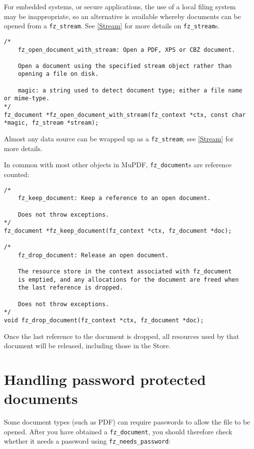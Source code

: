 \documentclass[oneside]{book}
\newcommand{\rjwref}[1] {\autoref{#1} \nameref{#1}}
\begin{document}
For embedded systems, or secure applications, the use of a local filing system may be inappropriate, so an alternative is available whereby documents can be opened from a \texttt{fz\_stream}. See \rjwref{Stream} for more details on \texttt{fz\_stream}s.

\begin{lstlisting}
/*
	fz_open_document_with_stream: Open a PDF, XPS or CBZ document.

	Open a document using the specified stream object rather than
	opening a file on disk.

	magic: a string used to detect document type; either a file name or mime-type.
*/
fz_document *fz_open_document_with_stream(fz_context *ctx, const char *magic, fz_stream *stream);
\end{lstlisting}

Almost any data source can be wrapped up as a \texttt{fz\_stream}; see \rjwref{Stream} for more details.

In common with most other objects in MuPDF, \texttt{fz\_document}s are reference counted:

\begin{lstlisting}
/*
	fz_keep_document: Keep a reference to an open document.
	
	Does not throw exceptions.
*/
fz_document *fz_keep_document(fz_context *ctx, fz_document *doc);

/*
	fz_drop_document: Release an open document.

	The resource store in the context associated with fz_document
	is emptied, and any allocations for the document are freed when
	the last reference is dropped.

	Does not throw exceptions.
*/
void fz_drop_document(fz_context *ctx, fz_document *doc);
\end{lstlisting}

Once the last reference to the document is dropped, all resources used by that document will be released, including those in the Store.


\section{Handling password protected documents}


Some document types (such as PDF) can require passwords to allow the file to be opened. After you have obtained a \texttt{fz\_document}, you should therefore check whether it needs a password using \texttt{fz\_needs\_password}:
\end{document}
